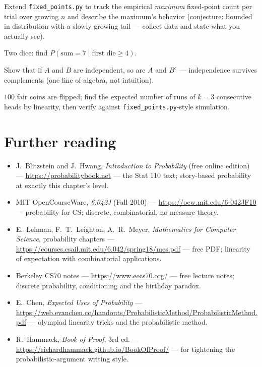 \begin{exercise}[hard]
Extend \texttt{fixed\_points.py} to track the empirical \emph{maximum}
fixed-point count per trial over growing $n$ and describe the
maximum's behavior (conjecture: bounded in distribution with a slowly
growing tail --- collect data and state what you actually see).
\end{exercise}
\begin{exercise}[easy]
Two dice: find $P(\text{sum} = 7 \mid \text{first die} \ge 4)$.
\end{exercise}
\begin{exercise}[medium]
Show that if $A$ and $B$ are independent, so are $A$ and $B^c$ ---
independence survives complements (one line of algebra, not intuition).
\end{exercise}
\begin{exercise}[hard]
$100$ fair coins are flipped; find the expected number of runs of
$k = 3$ consecutive heads by linearity, then verify against
\texttt{fixed\_points.py}-style simulation.
\end{exercise}

\section*{Further reading}
\begin{itemize}
\item J.~Blitzstein and J.~Hwang, \emph{Introduction to Probability}
(free online edition) ---
\url{https://probabilitybook.net} --- the Stat 110 text; story-based
probability at exactly this chapter's level.
\item MIT OpenCourseWare, \emph{6.042J} (Fall 2010) ---
\url{https://ocw.mit.edu/6-042JF10} --- probability for CS; discrete,
combinatorial, no measure theory.
\item E.~Lehman, F.~T.~Leighton, A.~R.~Meyer, \emph{Mathematics for
Computer Science}, probability chapters ---
\url{https://courses.csail.mit.edu/6.042/spring18/mcs.pdf} --- free PDF;
linearity of expectation with combinatorial applications.
\item Berkeley CS70 notes ---
\url{https://www.eecs70.org/} --- free lecture notes; discrete
probability, conditioning and the birthday paradox.
\item E.~Chen, \emph{Expected Uses of Probability} ---
\url{https://web.evanchen.cc/handouts/ProbabilisticMethod/ProbabilisticMethod.pdf}
--- olympiad linearity tricks and the probabilistic method.
\item R.~Hammack, \emph{Book of Proof}, 3rd ed. ---
\url{https://richardhammack.github.io/BookOfProof/} --- for tightening
the probabilistic-argument writing style.
\end{itemize}

